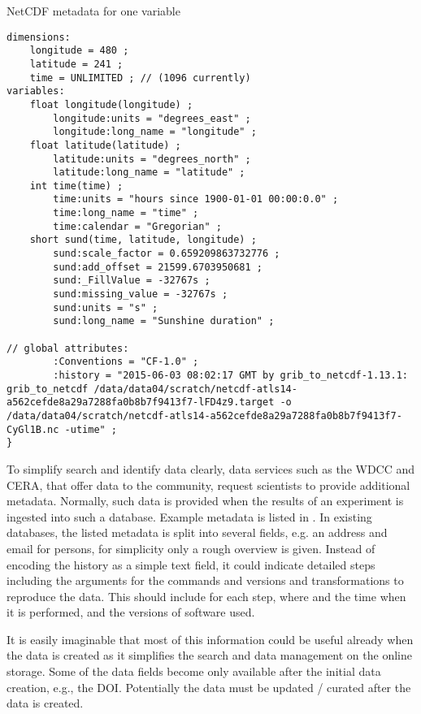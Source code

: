 \begin{tcbcode}[label={lst:NetCDF-data-map}]{NetCDF metadata for one variable}
\begin{lstlisting}
dimensions:
	longitude = 480 ;
	latitude = 241 ;
	time = UNLIMITED ; // (1096 currently)
variables:
	float longitude(longitude) ;
		longitude:units = "degrees_east" ;
		longitude:long_name = "longitude" ;
	float latitude(latitude) ;
		latitude:units = "degrees_north" ;
		latitude:long_name = "latitude" ;
	int time(time) ;
		time:units = "hours since 1900-01-01 00:00:0.0" ;
		time:long_name = "time" ;
		time:calendar = "Gregorian" ;
	short sund(time, latitude, longitude) ;
		sund:scale_factor = 0.659209863732776 ;
		sund:add_offset = 21599.6703950681 ;
		sund:_FillValue = -32767s ;
		sund:missing_value = -32767s ;
		sund:units = "s" ;
		sund:long_name = "Sunshine duration" ;

// global attributes:
		:Conventions = "CF-1.0" ;
		:history = "2015-06-03 08:02:17 GMT by grib_to_netcdf-1.13.1: grib_to_netcdf /data/data04/scratch/netcdf-atls14-a562cefde8a29a7288fa0b8b7f9413f7-lFD4z9.target -o /data/data04/scratch/netcdf-atls14-a562cefde8a29a7288fa0b8b7f9413f7-CyGl1B.nc -utime" ;
}
\end{lstlisting}
\end{tcbcode}

To simplify search and identify data clearly, data services such as the WDCC and CERA, that offer data to the community, request scientists to provide additional metadata.
Normally, such data is provided when the results of an experiment is ingested into such a database.
Example metadata is listed in .
In existing databases, the listed metadata is split into several fields, e.g. an address and email for persons, for simplicity only a rough overview is given.
Instead of encoding the history as a simple text field, it could
indicate detailed steps including the arguments for the commands and versions and transformations to reproduce the data.
This should include for each step, where and the time when it is performed, and the versions of software used.

It is easily imaginable that most of this information could be useful already when the data is created as it simplifies the search and data management on the online storage.
Some of the data fields become only available after the initial data creation, e.g., the DOI.
Potentially the data must be updated / curated after the data is created.

